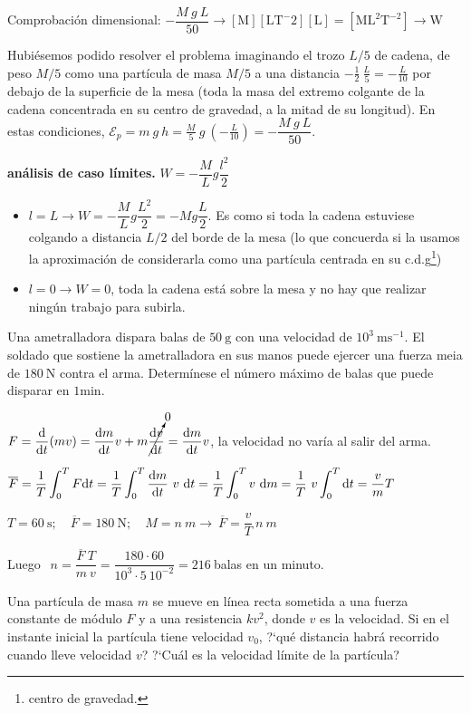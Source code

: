 \textcolor{gris}{Comprobación dimensional: $-\dfrac{M\ g\ L }{50} \to 
[\mathrm{M}][\mathrm{LT}^-{2}][\mathrm{L}]=[\mathrm{ML}^2\mathrm{T}^{-2}]\to \mathrm{W}$}


\textcolor{gris}{\textsf{Hubiésemos podido resolver el problema imaginando el trozo $L/5$ de cadena, de peso $M/5$ como una partícula de masa $M/5$ a una distancia $-\frac 1 2 \ \frac L 5=-\frac {L}{10}$ por debajo de la superficie de la mesa (toda la masa del extremo colgante de la cadena concentrada en su centro de gravedad, a la mitad de su longitud). En estas condiciones, $\mathcal E_p=m \ g \ h=\frac M 5 \ g \ \left( -\frac L {10} \right) = -\dfrac{M\ g\ L }{50}$.}}

\textbf{análisis de caso límites.} $W=-\dfrac M L g \dfrac {l^2}2$
\begin{itemize}
\item $l=L \to W=-\dfrac M L g \dfrac {L^2}2=-Mg\dfrac L 2$. Es como si toda la cadena estuviese colgando a distancia $L/2$ del borde de la mesa (lo que concuerda si la usamos la aproximación de considerarla como una partícula centrada en su c.d.g\footnote{centro de gravedad.})
\item $l=0 \to W=0$, toda la cadena está sobre la mesa y no hay que realizar ningún trabajo para subirla.
\end{itemize}


\begin{prob}
Una ametralladora dispara balas de $50\ \mathrm{g}$ con una velocidad de $10^3\ \mathrm{ms}^{-1}$. El soldado que sostiene la ametralladora en sus manos puede ejercer una fuerza meia de $180\ \mathrm{N}$ contra el arma. Determínese el número máximo de balas que puede disparar en $1 \mathrm{min}$.	
\end{prob}

$F=\displaystyle \dv{t} (mv)=\dv{m}{t} v + m \cancelto{0}{\dv{v}{t}}=\dv{m}{t} v$, la velocidad no varía al salir del  arma.

$\overline{F} \displaystyle =\dfrac 1 T \int_0^T F \dd t=\dfrac 1 T \int_0^T \dv{m}{t} \ v\  \dd t=\dfrac 1 T \int_0^T v\  \dd m= \dfrac 1 T\  v \int_0^T \dd t = \dfrac v m T$

$T=60 \ \mathrm{s}; \quad \overline{F}=180\ \mathrm{N}; \quad M=n\ m \to \ \overline{F}=\dfrac v T \ n \ m$

Luego $\ \ n=\dfrac {\overline{F} \ T}{m \ v}= \dfrac{180 \cdot 60}{10^3 \cdot 5\ 10^{-2}}=216\ $balas en un minuto.


\begin{prob}
Una partícula de masa $m$ se mueve	en línea recta sometida a una fuerza constante de módulo $F$ y a una resistencia $kv^2$, donde $v$ es la velocidad. Si en el instante inicial la partícula tiene velocidad $v_0$, ?`qué distancia habrá recorrido cuando lleve velocidad $v$? ?`Cuál es la velocidad límite de la partícula? 
\end{prob}

